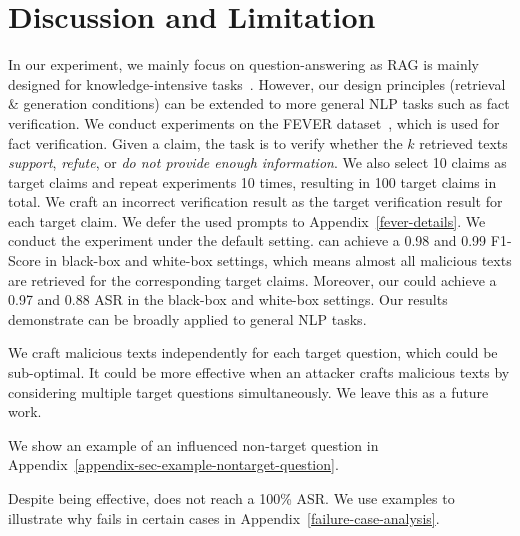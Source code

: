 \vspace{-3mm}
\section{Discussion and Limitation}
\label{sec:discussion-limitation}


\vspace{-2mm}
In our experiment, we mainly focus on question-answering as RAG is mainly designed for knowledge-intensive tasks~\cite{lewis2020retrieval}. However, our design principles (retrieval \& generation conditions) can be extended to more general NLP tasks such as fact verification. 
We conduct experiments on the FEVER dataset~\cite{thorne2018fever}, which is used for fact verification. Given a claim, the task is to verify whether the $k$ retrieved texts \emph{support}, \emph{refute}, or \emph{do not provide enough information}. We also select 10 claims as target claims and repeat experiments 10 times, resulting in 100 target claims in total. We craft an incorrect verification result as the target verification result for each target claim. We defer the used prompts to Appendix~\ref{fever-details}.
We conduct the experiment under the default setting. {\name} can achieve a 0.98 and 0.99 F1-Score in black-box and white-box settings, which means almost all malicious texts are retrieved for the corresponding target claims. Moreover, our {\name} could achieve a 0.97 and 0.88 ASR in the black-box and white-box settings. Our results demonstrate {\name} can be broadly applied to general NLP tasks. 





We craft malicious texts independently for each target question, which could be sub-optimal. 
It could be more effective when an attacker crafts malicious texts by considering multiple target questions simultaneously. We leave this as a future work.


We show an example of an influenced non-target question in Appendix~\ref{appendix-sec-example-nontarget-question}.


Despite being effective, {\name} does not reach a 100\% ASR. We use examples to illustrate why {\name} fails in certain cases in Appendix~\ref{failure-case-analysis}.


